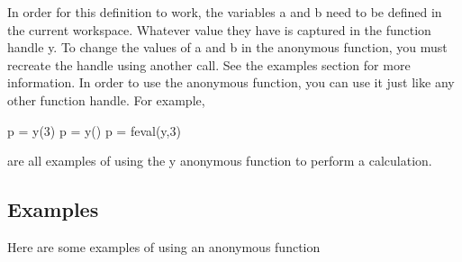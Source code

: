  In order for this definition to work, the variables {\ttfamily a} and {\ttfamily b} need to be defined in the current workspace. Whatever value they have is captured in the function handle {\ttfamily y}. To change the values of {\ttfamily a} and {\ttfamily b} in the anonymous function, you must recreate the handle using another call. See the examples section for more information. In order to use the anonymous function, you can use it just like any other function handle. For example, \begin{DoxyVerb}   p = y(3)
   p = y()
   p = feval(y,3)
\end{DoxyVerb}
 are all examples of using the {\ttfamily y} anonymous function to perform a calculation. \hypertarget{variables_matrix_Examples}{}\subsection{Examples}\label{variables_matrix_Examples}
Here are some examples of using an anonymous function


